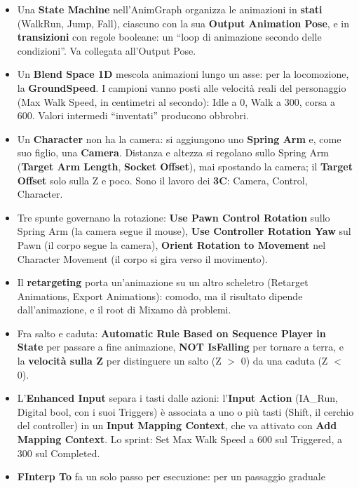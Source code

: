 \begin{itemize}
  \item Una \textbf{State Machine} nell'AnimGraph organizza le animazioni in
        \textbf{stati} (WalkRun, Jump, Fall), ciascuno con la sua \textbf{Output
        Animation Pose}, e in \textbf{transizioni} con regole booleane: un ``loop di
        animazione secondo delle condizioni''. Va collegata all'Output Pose.
  \item Un \textbf{Blend Space 1D} mescola animazioni lungo un asse: per la locomozione,
        la \textbf{GroundSpeed}. I campioni vanno posti alle velocità reali del
        personaggio (Max Walk Speed, in centimetri al secondo): Idle a 0, Walk a 300,
        corsa a 600. Valori intermedi ``inventati'' producono obbrobri.
  \item Un \textbf{Character} non ha la camera: si aggiungono uno \textbf{Spring Arm} e,
        come suo figlio, una \textbf{Camera}. Distanza e altezza si regolano sullo
        Spring Arm (\textbf{Target Arm Length}, \textbf{Socket Offset}), mai spostando la
        camera; il \textbf{Target Offset} solo sulla Z e poco. Sono il lavoro dei
        \textbf{3C}: Camera, Control, Character.
  \item Tre spunte governano la rotazione: \textbf{Use Pawn Control Rotation} sullo
        Spring Arm (la camera segue il mouse), \textbf{Use Controller Rotation Yaw} sul
        Pawn (il corpo segue la camera), \textbf{Orient Rotation to Movement} nel
        Character Movement (il corpo si gira verso il movimento).
  \item Il \textbf{retargeting} porta un'animazione su un altro scheletro (Retarget
        Animations, Export Animations): comodo, ma il risultato dipende dall'animazione,
        e il root di Mixamo dà problemi.
  \item Fra salto e caduta: \textbf{Automatic Rule Based on Sequence Player in State} per
        passare a fine animazione, \textbf{NOT IsFalling} per tornare a terra, e la
        \textbf{velocità sulla Z} per distinguere un salto (Z $>$ 0) da una caduta
        (Z $<$ 0).
  \item L'\textbf{Enhanced Input} separa i tasti dalle azioni: l'\textbf{Input Action}
        (IA\_Run, Digital bool, con i suoi Triggers) è associata a uno o più tasti
        (Shift, il cerchio del controller) in un \textbf{Input Mapping Context}, che va
        attivato con \textbf{Add Mapping Context}. Lo sprint: Set Max Walk Speed a 600
        sul Triggered, a 300 sul Completed.
  \item \textbf{FInterp To} fa un solo passo per esecuzione: per un passaggio graduale

\end{itemize}
